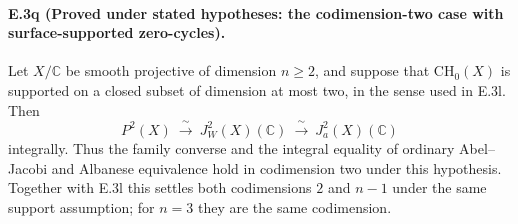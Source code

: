 \paragraph{E.3q (Proved under stated hypotheses: the codimension-two
case with surface-supported zero-cycles).}
Let $X/\mathbb C$ be smooth projective of dimension $n\ge2$,
and suppose that $\mathrm{CH}_0(X)$ is supported on a closed
subset of dimension at most two, in the sense used in E.3l.
Then
\[
 P^2(X)\ \xrightarrow{\ \sim\ }\ J_W^2(X)(\mathbb C)
          \ \xrightarrow{\ \sim\ }\ J_a^2(X)(\mathbb C)
\]
integrally. Thus the family converse and the integral equality
of ordinary Abel--Jacobi and Albanese equivalence hold in
codimension two under this hypothesis. Together with E.3l this
settles both codimensions $2$ and $n-1$ under the same support
assumption; for $n=3$ they are the same codimension.

